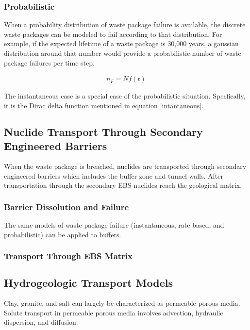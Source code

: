 \subsubsection{Probabilistic}

When a probability distribution of waste package failure is available, the 
discrete waste packages can be modeled to fail according to that distribution. 
For example, if the expected lifetime of a waste package is 30,000 years, a 
gaussian distribution around that number would provide a probabilistic number of 
waste package failures per time step. 

\begin{align}
  n_F=Nf(t)
  \label{probabilistic}
\end{align}

The instantaneous case is a special case of the probabilistic situation. 
Specfically, it is the Dirac delta function mentioned in equation 
\eqref{intantaneous}.


\subsection{Nuclide Transport Through Secondary Engineered Barriers}

When the waste package is breached, nuclides are transported through secondary 
engineered barriers which includes the buffer zone and tunnel walls. After 
transportation through the secondary EBS nuclides reach the geological matrix. 

\subsubsection{Barrier Dissolution and Failure}

The same models of waste package failure (instantaneous, rate based, and 
probabilistic) can be applied to buffers.

\subsubsection{Transport Through EBS Matrix}



\subsection{Hydrogeologic Transport Models}
Clay, granite, and salt can largely be characterized as permeable porous media. 
Solute transport in permeable porous media involves advection, hydraulic 
dispersion, and diffusion. 

